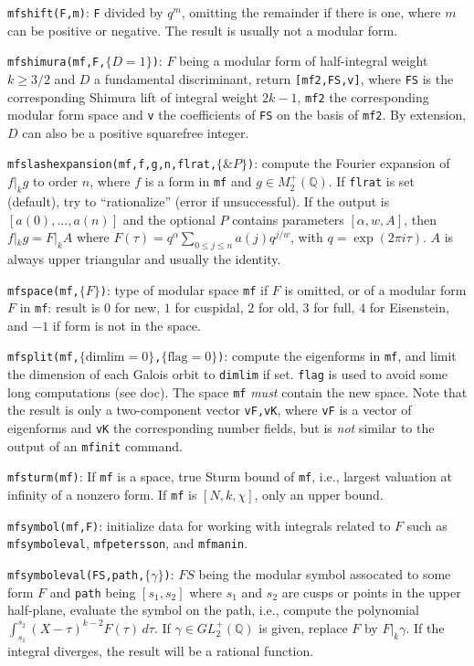 \documentclass[11pt]{article}
\newcommand{\Q}{{\mathbb Q}}
\newcommand{\al}{\alpha}
\newcommand{\ga}{\gamma}
\def\kbd#1{{\tt #1}}
\begin{document}
\f\kbd{mfshift(F,m)}: \kbd{F} divided by $q^m$, omitting the remainder if there
is one, where $m$ can be positive or negative. The result is usually not
a modular form.

\f\kbd{mfshimura(mf,F,$\{D = 1\}$)}: $F$ being a modular form of
half-integral weight $k\ge3/2$ and $D$ a fundamental discriminant, return
\kbd{[mf2,FS,v]}, where \kbd{FS} is the corresponding Shimura lift of integral
weight $2k-1$, \kbd{mf2} the corresponding modular form space and \kbd{v} the
coefficients of \kbd{FS} on the basis of \kbd{mf2}. By extension, $D$ can also
be a positive squarefree integer.

\f\kbd{mfslashexpansion(mf,f,g,n,flrat,$\{\&P\}$)}: compute the Fourier
expansion of $f|_k g$ to order $n$, where $f$ is a form in \kbd{mf} and
$g\in M_2^+(\Q)$. If \kbd{flrat} is set (default), try to ``rationalize''
(error if unsuccessful). If the output is $[a(0),...,a(n)]$ and the
optional $P$ contains parameters $[\al,w,A]$, then $f|_k g = F|_k A$
where
$F(\tau) = q^{\al}\sum_{0\le j\le n}a(j)q^{j/w}$, with $q=\exp(2\pi i\tau)$.
$A$ is always upper triangular and usually the identity.

\f\kbd{mfspace(mf,$\{F\}$)}: type of modular space \kbd{mf} if $F$ is omitted,
or of a modular form $F$ in \kbd{mf}: result is $0$ for new, $1$ for cuspidal,
$2$ for old, $3$ for full, $4$ for Eisenstein, and $-1$ if form is not in
the space.

\f\kbd{mfsplit(mf,$\{\text{dimlim}=0\}$,$\{\text{flag}=0\}$)}: compute the
eigenforms in \kbd{mf}, and limit the dimension of each Galois orbit to
\kbd{dimlim} if set. \kbd{flag} is used to avoid some long computations (see
doc). The space \kbd{mf} \emph{must} contain the new space. Note that the
result is only a two-component vector \kbd{vF,vK}, where \kbd{vF} is a vector
of eigenforms and \kbd{vK} the corresponding number fields, but is \emph{not}
similar to the output of an \kbd{mfinit} command.

\f\kbd{mfsturm(mf)}: If \kbd{mf} is a space, true Sturm bound of \kbd{mf}, i.e.,
largest valuation at infinity of a nonzero form. If \kbd{mf} is $[N,k,\chi]$,
only an upper bound.

\f\kbd{mfsymbol(mf,F)}: initialize data for working with integrals related
to $F$ such as \kbd{mfsymboleval}, \kbd{mfpetersson}, and \kbd{mfmanin}.

\f\kbd{mfsymboleval(FS,path,$\{\ga\}$)}: $FS$ being the modular symbol
assocated to some form $F$ and \kbd{path} being $[s_1,s_2]$ where $s_1$ and
$s_2$ are cusps or points in the upper half-plane, evaluate the symbol on the
path, i.e., compute the polynomial
$\int_{s_1}^{s_2}(X-\tau)^{k-2}F(\tau)\,d\tau$. If $\ga\in GL_2^+(\Q)$ is
given, replace $F$ by $F|_k\ga$. If the integral diverges, the result will be
a rational function.
\end{document}
